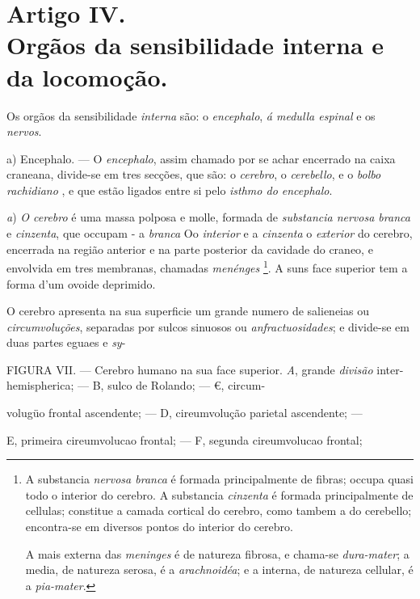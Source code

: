 
\section*{Artigo IV.\\ Orgãos da sensibilidade interna e da locomoção.}


Os orgãos da sensibilidade \emph{interna} são: o \emph{encephalo}, \emph{á medulla espinal} e os \emph{nervos}.

a) Encephalo. --- O \emph{encephalo}, assim chamado por se achar encerrado na caixa craneana, divide-se em tres secções, que são: o \emph{cerebro}, o \emph{cerebello}, e o \emph{bolbo rachidiano} , e que estão ligados entre si pelo \emph{isthmo do encephalo}.

\emph{a}) \emph{O cerebro} é uma massa polposa e molle, formada de \emph{substancia nervosa branca} e \emph{cinzenta}, que occupam - a \emph{branca} Oo \emph{interior} e a \emph{cinzenta} o \emph{exterior} do cerebro, encerrada na   região anterior e na parte posterior da cavidade do craneo, e envolvida em tres membranas, chamadas \emph{menénges} \footnote{A substancia \emph{nervosa branca} é formada principalmente de fibras; occupa quasi todo o interior do cerebro. A substancia \emph{cinzenta} é formada principalmente de cellulas; constitue a camada cortical do cerebro, como tambem a do cerebello; encontra-se em diversos pontos do interior do cerebro.\par A mais externa das \emph{meninges} é de natureza fibrosa, e chama-se \emph{dura-mater}; a media, de natureza serosa, é a \emph{arachnoidéa}; e a interna, de natureza cellular, é a \emph{pia-mater}.}. A suns face superior tem a forma d'um ovoide deprimido.

O cerebro apresenta na sua superficie um grande numero de salieneias ou \emph{circumvoluções}, separadas por sulcos sinuosos ou \emph{anfractuosidades}; e divide-se em duas partes eguaes e \emph{sy}-

FIGURA VII. --- Cerebro humano na sua face superior. \emph{A}, grande \emph{divisão} inter-hemispherica; --- B, sulco de Rolando; --- €, circum-

volugüo frontal ascendente; --- D, cireumvolução parietal ascendente; ---

E, primeira cireumvolucao frontal; --- F, segunda cireumvolucao frontal;

